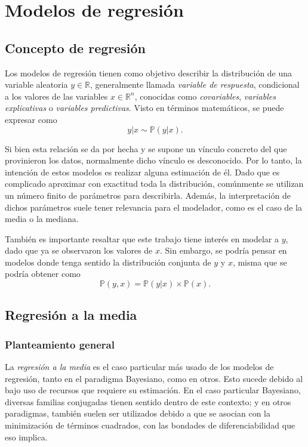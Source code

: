 \chapter[Modelos de regresi\'on]{Modelos de regresi\'on}

\section{Concepto de regresi\'on}

Los modelos de regresi\'on tienen como objetivo describir la distribuci\'on de una variable aleatoria $y \in \mathbb{R}$, generalmente llamada \textit{variable de respuesta}, condicional a los valores de las variables $x \in \mathbb{R}^n$, conocidas como \textit{covariables}, \textit{variables explicativas} o \textit{variables predictivas}. Visto en t\'erminos matem\'aticos, se puede expresar como
\begin{equation*}
    y|x \sim \mathbb{P}(y|x).
\end{equation*}

Si bien esta relaci\'on se da por hecha y se supone un v\'inculo concreto del que provinieron los datos, normalmente dicho v\'inculo es desconocido. Por lo tanto, la intenci\'on de estos modelos es realizar alguna estimaci\'on de \'el. Dado que es complicado aproximar con exactitud toda la distribuci\'on, com\'unmente se utilizan un n\'umero finito de par\'ametros para describirla. Adem\'as, la interpretaci\'on de dichos par\'ametros suele tener relevancia para el modelador, como es el caso de la media o la mediana. 

Tambi\'en es importante resaltar que este trabajo tiene inter\'es en modelar a $y$, dado que ya se observaron los valores de $x$. Sin embargo, se podr\'ia pensar en modelos donde tenga sentido la distribuci\'on conjunta de $y$ y $x$, misma que se podr\'ia obtener como
\begin{equation*}
    \mathbb{P}(y,x) = \mathbb{P}(y|x) \times \mathbb{P}(x).
\end{equation*}

\section{Regresión a la media}

\subsection{Planteamiento general}

La \textit{regresi\'on a la media} es el caso particular m\'as usado de los modelos de regresi\'on, tanto en el paradigma Bayesiano, como en otros. Esto sucede debido al bajo uso de recursos que requiere su estimaci\'on. En el caso particular Bayesiano, diversas familias conjugadas tienen sentido dentro de este contexto; y en otros paradigmas, tambi\'en suelen ser utilizados debido a que se asocian con la minimizaci\'on de t\'erminos cuadrados, con las bondades de diferenciabilidad que eso implica. 

